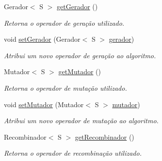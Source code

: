\begin{DoxyCompactItemize}
Gerador$<$ S $>$ \hyperlink{classic_1_1populacional_1_1algoritmo_1_1_algoritmo_evolucionario_3_01_gextends_01_number_01_6_co1efdb05fe19a950b8d1e9e15f7d06254_afe7d44c986de2ed75fc4d0dc1e279715}{get\-Gerador} ()
\begin{DoxyCompactList}\small\item\em Retorna o operador de geração utilizado. \end{DoxyCompactList}\item 
void \hyperlink{classic_1_1populacional_1_1algoritmo_1_1_algoritmo_evolucionario_3_01_gextends_01_number_01_6_co1efdb05fe19a950b8d1e9e15f7d06254_ad98dea12ac5aa49c3aedd64731277590}{set\-Gerador} (Gerador$<$ S $>$ \hyperlink{classic_1_1populacional_1_1algoritmo_1_1_algoritmo_evolucionario_3_01_gextends_01_number_01_6_co1efdb05fe19a950b8d1e9e15f7d06254_a2154470c0a2b1ae8fd1728d82217b40d}{gerador})
\begin{DoxyCompactList}\small\item\em Atribui um novo operador de geração ao algoritmo. \end{DoxyCompactList}\item 
Mutador$<$ S $>$ \hyperlink{classic_1_1populacional_1_1algoritmo_1_1_algoritmo_evolucionario_3_01_gextends_01_number_01_6_co1efdb05fe19a950b8d1e9e15f7d06254_a49c46ab9b5bfaab7199ab4ab996fc66c}{get\-Mutador} ()
\begin{DoxyCompactList}\small\item\em Retorna o operador de mutação utilizado. \end{DoxyCompactList}\item 
void \hyperlink{classic_1_1populacional_1_1algoritmo_1_1_algoritmo_evolucionario_3_01_gextends_01_number_01_6_co1efdb05fe19a950b8d1e9e15f7d06254_aa29043d9ec8f15f5c12146ef87f74e75}{set\-Mutador} (Mutador$<$ S $>$ \hyperlink{classic_1_1populacional_1_1algoritmo_1_1_algoritmo_evolucionario_3_01_gextends_01_number_01_6_co1efdb05fe19a950b8d1e9e15f7d06254_a87cb55bc36af5a64c095d7030449eab2}{mutador})
\begin{DoxyCompactList}\small\item\em Atribui um novo operador de mutação ao algoritmo. \end{DoxyCompactList}\item 
Recombinador$<$ S $>$ \hyperlink{classic_1_1populacional_1_1algoritmo_1_1_algoritmo_evolucionario_3_01_gextends_01_number_01_6_co1efdb05fe19a950b8d1e9e15f7d06254_a1dc1bba750535e8c0332be177fad63fa}{get\-Recombinador} ()
\begin{DoxyCompactList}\small\item\em Retorna o operador de recombinação utilizado. \end{DoxyCompactList}\item 

\end{DoxyCompactItemize}
